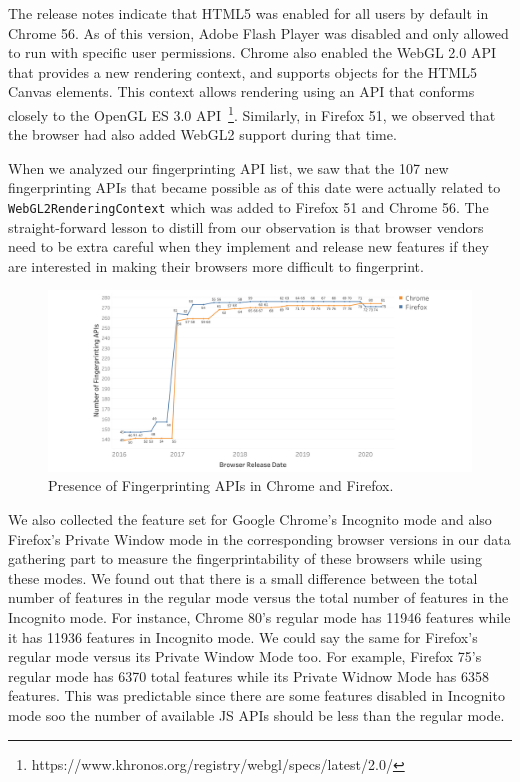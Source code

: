 The release notes indicate that HTML5 was enabled for all users by
default in Chrome 56. As of this version, Adobe Flash Player was
disabled and only allowed to run with specific user permissions.
Chrome also enabled the WebGL 2.0 API that provides a new rendering
context, and supports objects for the HTML5 Canvas elements. This
context allows rendering using an API that conforms closely to the
OpenGL ES 3.0
API~\footnote{https://www.khronos.org/registry/webgl/specs/latest/2.0/}.
Similarly, in Firefox 51, we observed that the browser had also added
WebGL2 support during that time.

When we analyzed our fingerprinting API list, we saw that the 107 new
fingerprinting APIs that became possible as of this date were actually
related to \texttt{WebGL2RenderingContext} which was added to Firefox
51 and Chrome 56. The straight-forward lesson to distill from our
observation is that browser vendors need to be extra careful when they
implement and release new features if they are interested in making
their browsers more difficult to fingerprint.

\begin{figure}[ht]
    \centering
    \includegraphics[width=\columnwidth]{figures/Fingerprinting-APIs.png}
    \caption{Presence of Fingerprinting APIs in Chrome and Firefox.}
    \label{fig:fingerprint-apis}
\end{figure}

We also collected the feature set for Google Chrome's Incognito mode
and also Firefox's Private Window mode in the corresponding browser versions
in our data gathering part to measure the fingerprintability of these browsers
while using these modes.
We found out that there is a small difference between the total number of features in the
regular mode versus the total number of features in the Incognito mode. 
For instance, Chrome 80's regular mode has 11946 features while it has 11936 features
in Incognito mode. We could say the same for Firefox's regular mode versus its Private Window Mode too.  
For example, Firefox 75's regular mode has 6370 total features while its Private Widnow Mode has 6358 features.
This was predictable since there are some features disabled in Incognito mode soo the number of available JS APIs
should be less than the regular mode.

